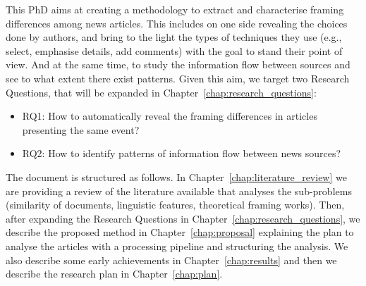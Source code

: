 
This PhD aims at creating a methodology to extract and characterise framing differences among news articles.
This includes on one side revealing the choices done by authors, and bring to the light the types of techniques they use (e.g., select, emphasise details, add comments)  with the goal to stand their point of view.
And at the same time, to study the information flow between sources and see to what extent there exist patterns.
Given this aim, we target two Research Questions, that will be expanded in Chapter~\ref{chap:research_questions}:

\begin{itemize}
    \item RQ1: How to automatically reveal the framing differences in articles presenting the same event?
    \item RQ2: How to identify patterns of information flow between news sources?
\end{itemize}








The document is structured as follows.
In Chapter~\ref{chap:literature_review} we are providing a review of the literature available that analyses the sub-problems (similarity of documents, linguistic features, theoretical framing works).
Then, after expanding the Research Questions in Chapter~\ref{chap:research_questions}, we describe the proposed method in Chapter~\ref{chap:proposal} explaining the plan to analyse the articles with a processing pipeline and structuring the analysis.
We also describe some early achievements in Chapter~\ref{chap:results} and then we describe the research plan in Chapter~\ref{chap:plan}.


